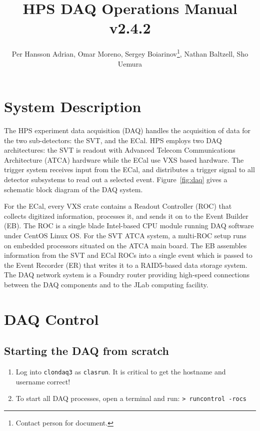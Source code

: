 \documentclass[12pt]{article}
\title{HPS DAQ Operations Manual v2.4.2}
\author{Per Hansson Adrian, Omar Moreno, Sergey Boiarinov\thanks{Contact person for document.}, Nathan Baltzell, Sho Uemura }
\begin{document}
\maketitle

\tableofcontents

\section{System Description}
The HPS experiment data acquisition (DAQ) handles the acquisition of data for the two sub-detectors: the SVT,  and the ECal. HPS employs two DAQ architectures: the SVT is readout with Advanced Telecom Communications Architecture (ATCA) hardware while the ECal use VXS based hardware. The trigger system receives input from the ECal, and distributes a trigger signal to all detector subsystems to read out a selected event. Figure~\ref{fig:daq} gives a schematic block diagram of the DAQ system.

For the ECal, every VXS crate contains a Readout Controller (ROC) that collects digitized information, processes it, and sends it on to the Event Builder (EB). The ROC is a single blade Intel-based CPU module running DAQ software under CentOS Linux OS. For the SVT ATCA system, a multi-ROC setup runs on embedded processors situated on the ATCA main board. The EB assembles information from the SVT and ECal ROCs into a single event which is passed to the Event Recorder (ER) that writes it to a RAID5-based data storage system. The DAQ network system is a Foundry router providing high-speed connections between the DAQ components and to the JLab computing facility. 

\newpage
\section{DAQ Control}
\label{sec:daq_control}

\subsection{Starting the DAQ from scratch}\label{sec:daqstart}

\begin{enumerate}
\item 
    Log into \texttt{clondaq3} as \texttt{clasrun}.
    \subitem It is critical to get the hostname and username correct!
\item 
To start all DAQ processes, open a terminal and run:\newline
\texttt{> runcontrol -rocs}\newline
\end{enumerate}
\end{document}
